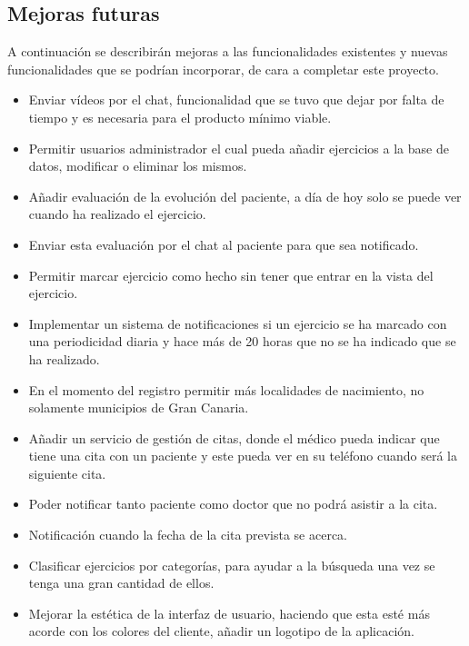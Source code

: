 \subsection{Mejoras futuras}
A continuación se describirán mejoras a las funcionalidades
existentes y nuevas funcionalidades que se podrían incorporar, de
cara a completar este proyecto.
\begin{itemize}
    \item Enviar vídeos por el chat, funcionalidad que se tuvo que
    dejar por falta de tiempo y es necesaria para el producto
    mínimo viable.
    \item Permitir usuarios administrador el cual pueda añadir
    ejercicios a la base de datos, modificar o eliminar los mismos.
    \item Añadir evaluación de la evolución del paciente, a día de hoy
    solo se puede ver cuando ha realizado el ejercicio.
    \item Enviar esta evaluación por el chat al paciente para que sea
    notificado.
    \item Permitir marcar ejercicio como hecho sin tener que entrar
    en la vista del ejercicio.
    \item Implementar un sistema de notificaciones si un ejercicio
    se ha marcado con una periodicidad diaria y hace más de 20 horas
    que no se ha indicado que se ha realizado.
    \item En el momento del registro permitir más localidades de
    nacimiento, no solamente municipios de Gran Canaria.
    \item Añadir un servicio de gestión de citas, donde el médico
    pueda indicar que tiene una cita con un paciente y este pueda
    ver en su teléfono cuando será la siguiente cita.
    \item Poder notificar tanto paciente como doctor que no podrá
    asistir a la cita.
    \item Notificación cuando la fecha de la cita prevista se acerca.
    \item Clasificar ejercicios por categorías, para ayudar a la búsqueda
    una vez se tenga una gran cantidad de ellos.
    \item Mejorar la estética de la interfaz de usuario, haciendo
    que esta esté más acorde con los colores del cliente, añadir un
    logotipo de la aplicación.
\end{itemize}